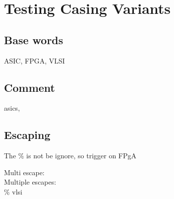 \documentclass{article}
\begin{document}
\section{Testing Casing Variants}

\subsection{Base words}
ASIC, FPGA, VLSI

\subsection{Comment}
asics, %

\subsection{Escaping}
The \% is not be ignore, so trigger on FPgA

Multi escape: \\%
Multiple escapes: \\\% vlsi
\end{document}
